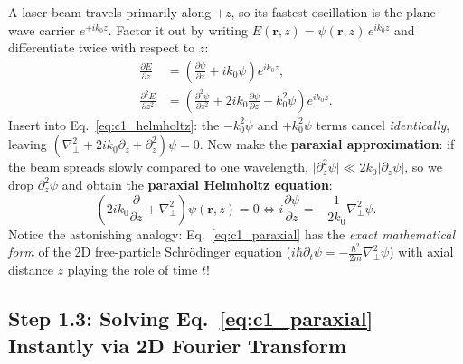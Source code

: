 \documentclass[10pt,letterpaper]{article}
\newcommand{\abs}[1]{\lvert #1 \rvert}
\numberwithin{equation}{section}
\begin{document}
A laser beam travels primarily along $+z$, so its fastest oscillation is the plane-wave carrier $e^{+ik_0 z}$. Factor it out by writing $E(\mathbf{r},z) = \psi(\mathbf{r},z)\,e^{ik_0 z}$ and differentiate twice with respect to $z$:
\begin{align}
  \frac{\partial E}{\partial z} &= \left(\frac{\partial\psi}{\partial z} + i k_0\psi\right)e^{ik_0 z}, \\
  \frac{\partial^2 E}{\partial z^2} &= \left(\frac{\partial^2\psi}{\partial z^2} + 2ik_0\frac{\partial\psi}{\partial z} - k_0^2\psi\right)e^{ik_0 z}.
\end{align}
Insert into Eq.~\eqref{eq:c1_helmholtz}: the $-k_0^2\psi$ and $+k_0^2\psi$ terms cancel \emph{identically}, leaving $(\nabla_\perp^2 + 2ik_0\partial_z + \partial_z^2)\psi = 0$. Now make the \textbf{paraxial approximation}: if the beam spreads slowly compared to one wavelength, $\abs{\partial_z^2\psi} \ll 2k_0\abs{\partial_z\psi}$, so we drop $\partial_z^2\psi$ and obtain the \textbf{paraxial Helmholtz equation}:
\begin{equation}
  \left(2ik_0\frac{\partial}{\partial z} + \nabla_\perp^2\right)\psi(\mathbf{r},z) = 0
  \iff i\frac{\partial\psi}{\partial z} = -\frac{1}{2k_0}\nabla_\perp^2\psi.
  \label{eq:c1_paraxial}
\end{equation}
Notice the astonishing analogy: Eq.~\eqref{eq:c1_paraxial} has the \emph{exact mathematical form} of the 2D free-particle Schr\"odinger equation ($i\hbar\partial_t\psi = -\frac{\hbar^2}{2m}\nabla_\perp^2\psi$) with axial distance $z$ playing the role of time $t$!

\subsection{Step 1.3: Solving Eq.~\eqref{eq:c1_paraxial} Instantly via 2D Fourier Transform}
\end{document}
